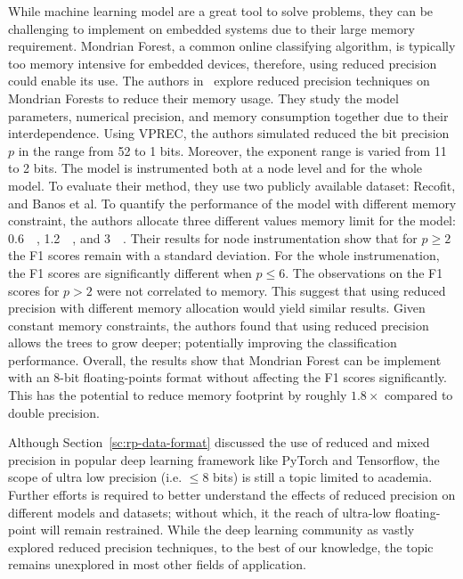 While machine learning model are a great tool to solve problems, they can be challenging
to implement on embedded systems due to their large memory requirement.
Mondrian Forest, a common online classifying algorithm, is typically too memory intensive
for embedded devices, therefore, using reduced precision could enable its use.
The authors in~\cite{Vicuna2021-mw} explore reduced precision techniques on Mondrian Forests
to reduce their memory usage.
They study the model parameters, numerical precision, and memory consumption together
due to their interdependence.
Using VPREC, the authors simulated reduced the bit precision $p$ in the range from 52 to 1 bits.
Moreover, the exponent range is varied from 11 to 2 bits.
The model is instrumented both at a node level and for the whole model.
To evaluate their method, they use two publicly available dataset: Recofit, and Banos et al.
To quantify the performance of the model with different memory constraint, the authors allocate three
different values memory limit for the model: \SI{0.6}{\mega\byte}, \SI{1.2}{\mega\byte}, and \SI{3}{\mega\byte}.
Their results for node instrumentation show that for $p \ge 2$ the F1 scores remain with a standard deviation.
For the whole instrumenation, the F1 scores are significantly different when $p \le 6$.
The observations on the F1 scores for $p > 2$ were not correlated to memory.
This suggest that using reduced precision with different memory allocation would yield similar results.
Given constant memory constraints, the authors found that using reduced precision allows the 
trees to grow deeper; potentially improving the classification performance.
Overall, the results show that Mondrian Forest can be implement with an 8-bit floating-points
format without affecting the F1 scores significantly.
This has the potential to reduce memory footprint by roughly $1.8\times$ compared to double precision.

Although Section~\ref{sc:rp-data-format} discussed the use of reduced and mixed precision
in popular deep learning framework like PyTorch and Tensorflow, the scope of ultra low 
precision (i.e. $\le 8$ bits) is still a topic limited to academia.
Further efforts is required to better understand the effects of reduced precision
on different models and datasets; without which, it the reach of ultra-low floating-point
will remain restrained.
While the deep learning community as vastly explored reduced precision techniques,
to the best of our knowledge, the topic remains unexplored in most other fields of application.

